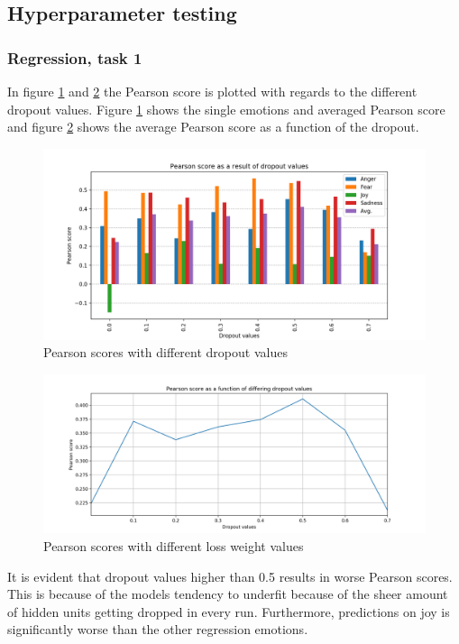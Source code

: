 \subsection{Hyperparameter testing}
\subsubsection{Regression, task 1}
In figure \ref{fig:dropoutvalues} and \ref{fig:averagedropout} the Pearson score is plotted with regards to the different dropout values. Figure \ref{fig:dropoutvalues} shows the single emotions and averaged Pearson score and figure \ref{fig:averagedropout} shows the average Pearson score as a function of the dropout.
\begin{figure}[H]
    \centering
        \includegraphics[width=\textwidth]{pictures/dropoutvalues.png}
        \caption{Pearson scores with different dropout values}
        \label{fig:dropoutvalues}
\end{figure}
\begin{figure}[H]
    \centering
        \includegraphics[width=\textwidth]{pictures/DropoutPlot.png}
        \caption{Pearson scores with different loss weight values}
        \label{fig:averagedropout}
\end{figure}
It is evident that dropout values higher than 0.5 results in worse Pearson scores. This is because of the models tendency to underfit because of the sheer amount of hidden units getting dropped in every run. Furthermore, predictions on joy is significantly worse than the other regression emotions.\\
